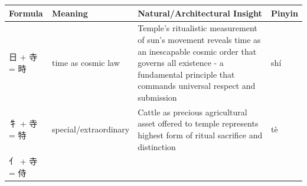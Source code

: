 \begin{longtable}[]{@{}llll@{}}
\toprule
\begin{minipage}[b]{0.14\columnwidth}\raggedright
Formula\strut
\end{minipage} & \begin{minipage}[b]{0.14\columnwidth}\raggedright
Meaning\strut
\end{minipage} & \begin{minipage}[b]{0.45\columnwidth}\raggedright
Natural/Architectural Insight\strut
\end{minipage} & \begin{minipage}[b]{0.14\columnwidth}\raggedright
Pinyin\strut
\end{minipage}\tabularnewline
\midrule
\endhead
\begin{minipage}[t]{0.14\columnwidth}\raggedright
日 + 寺 = 時\strut
\end{minipage} & \begin{minipage}[t]{0.14\columnwidth}\raggedright
time as cosmic law\strut
\end{minipage} & \begin{minipage}[t]{0.45\columnwidth}\raggedright
Temple's ritualistic measurement of sun's movement reveals time as an
inescapable cosmic order that governs all existence - a fundamental
principle that commands universal respect and submission\strut
\end{minipage} & \begin{minipage}[t]{0.14\columnwidth}\raggedright
shí\strut
\end{minipage}\tabularnewline
\begin{minipage}[t]{0.14\columnwidth}\raggedright
牜 + 寺 = 特\strut
\end{minipage} & \begin{minipage}[t]{0.14\columnwidth}\raggedright
special/extraordinary\strut
\end{minipage} & \begin{minipage}[t]{0.45\columnwidth}\raggedright
Cattle as precious agricultural asset offered to temple represents
highest form of ritual sacrifice and distinction\strut
\end{minipage} & \begin{minipage}[t]{0.14\columnwidth}\raggedright
tè\strut
\end{minipage}\tabularnewline
\begin{minipage}[t]{0.14\columnwidth}\raggedright
亻 + 寺 = 侍\strut
\end{minipage} & \begin{minipage}[t]{0.14\columnwidth}\raggedright

\end{minipage}
\end{longtable}

